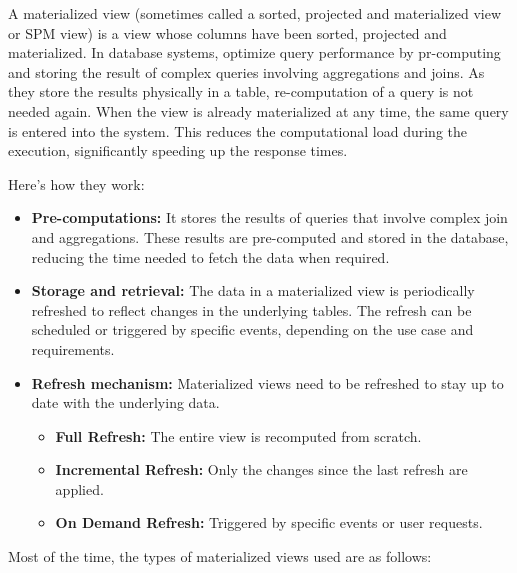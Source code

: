 A materialized view (sometimes called a sorted, projected and materialized view or SPM view) is a view whose columns have been sorted, projected and materialized.\cite{IBM} In database systems, optimize query performance by pr-computing and storing the result of complex queries involving aggregations and joins. As they store the results physically in a table, re-computation of a query is not needed again. When the view is already materialized at any time, the same query is entered into the system. This reduces the computational load during the execution, significantly speeding up the response times.\vspace{.4cm}

Here's how they work:
\begin{itemize}
    \item\textbf{Pre-computations:} It stores the results of queries that involve complex join and aggregations. These results are pre-computed and stored in the database, reducing the time needed to fetch the data when required.
    \item\textbf{Storage and retrieval:} The data in a materialized view is periodically refreshed to reflect changes in the underlying tables. The refresh can be scheduled or triggered by specific events, depending on the use case and requirements.
    \item\textbf{Refresh mechanism:}  Materialized views need to be refreshed to stay up to date with the underlying data.\vspace{.4cm}

    \begin{itemize}
        \item\textbf{Full Refresh:} The entire view is recomputed from scratch.
        \item\textbf{Incremental Refresh:} Only the changes since the last refresh are applied.
        \item\textbf{On Demand Refresh:} Triggered by specific events or user requests.
    \end{itemize}
\end{itemize}\vspace{.4cm}

Most of the time, the types of materialized views used are as follows:\vspace{.4cm}

